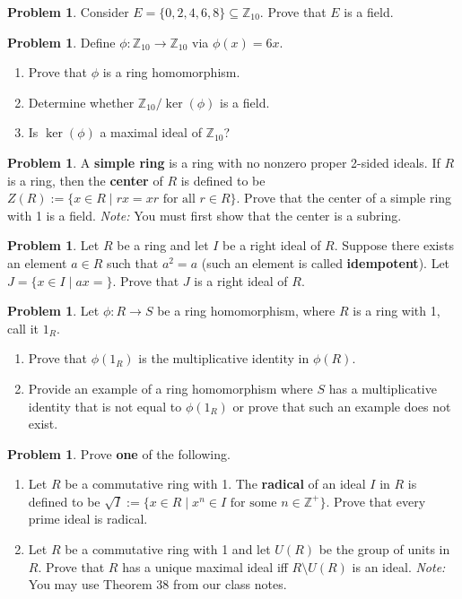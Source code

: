 \documentclass[11pt]{scrartcl}
\theoremstyle{definition}
\newtheorem{problem}[theorem]{Problem}
\begin{document}
\begin{problem}
Consider $E=\{0,2,4,6,8\}\subseteq \mathbb{Z}_{10}$.  Prove that $E$ is a field.
\end{problem}

\begin{problem}
Define $\phi:\mathbb{Z}_{10}\to \mathbb{Z}_{10}$ via $\phi(x)=6x$. 
\begin{enumerate}[label=\rm{(\alph*)}]
\item Prove that $\phi$ is a ring homomorphism.
\item Determine whether $\mathbb{Z}_{10}/\ker(\phi)$ is a field.
\item Is $\ker(\phi)$ a maximal ideal of $\mathbb{Z}_{10}$?
\end{enumerate}
\end{problem}

\begin{problem}
A \textbf{simple ring} is a ring with no nonzero proper 2-sided ideals.  If $R$ is a ring, then the \textbf{center} of $R$ is defined to be $Z(R):=\{x\in R\mid rx=xr\text{ for all } r\in R\}$.  Prove that the center of a simple ring with 1 is a field.  \emph{Note:} You must first show that the center is a subring.
\end{problem}

\begin{problem}
Let $R$ be a ring and let $I$ be a right ideal of $R$.  Suppose there exists an element $a\in R$ such that $a^2=a$ (such an element is called \textbf{idempotent}). Let $J=\{x\in I\mid ax=\}$. Prove that $J$ is a right ideal of $R$.
\end{problem}

\begin{problem}
Let $\phi:R\to S$ be a ring homomorphism, where $R$ is a ring with 1, call it $1_R$.
\begin{enumerate}[label=\rm{(\alph*)}]
\item Prove that $\phi(1_R)$ is the multiplicative identity in $\phi(R)$.
\item Provide an example of a ring homomorphism where $S$ has a multiplicative identity that is not equal to $\phi(1_R)$ or prove that such an example does not exist.
\end{enumerate}
\end{problem}

\begin{problem}
Prove \textbf{one} of the following.
\begin{enumerate}[label=\rm{(\alph*)}]
\item Let $R$ be a commutative ring with 1.  The \textbf{radical} of an ideal $I$ in $R$ is defined to be $\sqrt{I}:=\{x\in R\mid x^n\in I\text{ for some }n\in\mathbb{Z}^+\}$. Prove that every prime ideal is radical.
\item Let $R$ be a commutative ring with 1 and let $U(R)$ be the group of units in $R$.  Prove that $R$ has a unique maximal ideal iff $R\setminus U(R)$ is an ideal.  \emph{Note:} You may use Theorem 38 from our class notes.
\end{enumerate}
\end{problem}
\end{document}
